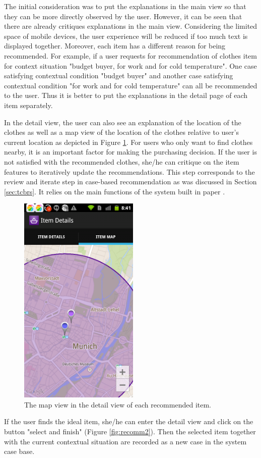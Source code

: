 The initial consideration was to put the explanations in the main view so that they can be more directly observed by the user. However, it can be seen that there are already critiques explanations in the main view. Considering the limited space of mobile devices, the user experience will be reduced if too much text is displayed together. Moreover, each item has a different reason for being recommended. For example, if a user requests for recommendation of clothes item for context situation "budget buyer, for work and for cold temperature". One case satisfying contextual condition "budget buyer" and another case satisfying contextual condition "for work and for cold temperature" can all be recommended to the user. Thus it is better to put the explanations in the detail page of each item separately.

In the detail view, the user can also see an explanation of the location of the clothes as well as a map view of the location of the clothes relative to user's current location as depicted in Figure \ref{fig:detailmap}. For users who only want to find clothes nearby, it is an important factor for making the purchasing decision. If the user is not satisfied with the recommended clothes, she/he can critique on the item features to iteratively update the recommendations. This step corresponds to the review and iterate step in case-based recommendation as was discussed in Section \ref{sec:tcbrs}. It relies on the main functions of the system built in paper \cite{ref:30}.

\begin{figure}[H]
	\centering
	\includegraphics[height=4in]{figures/recommdetailmap.png}
	\caption{The map view in the detail view of each recommended item.}
	\label{fig:detailmap}
\end{figure}

If the user finds the ideal item, she/he can enter the detail view and click on the button "select and finish" (Figure \ref{fig:recomm2}). Then the selected item together with the current contextual situation are recorded as a new case in the system case base. 




















